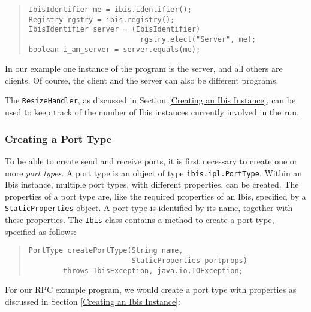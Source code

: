 \documentclass[10pt]{article}
\begin{document}
\begin{quote}
\begin{verbatim}
IbisIdentifier me = ibis.identifier();
Registry rgstry = ibis.registry();
IbisIdentifier server = (IbisIdentifier)
                          rgstry.elect("Server", me);
boolean i_am_server = server.equals(me);
\end{verbatim}
\end{quote}

In our example one instance of the program is the server, and all
others are clients.  Of course, the client and the server can also
be different programs.

The \texttt{ResizeHandler}, as discussed in Section
\ref{Creating an Ibis Instance}, can be used to keep track of the number
of Ibis instances currently involved in the run.

\subsubsection{Creating a Port Type}

To be able to create send and receive ports, it is first necessary
to create one or more \emph{port types}.
A port type is an object
of type \texttt{ibis.ipl.PortType}.
Within an Ibis instance,
multiple port types, with different properties, can be created.
The properties of a port type are, like the required properties
of an Ibis, specified by a \texttt{StaticProperties} object.
A port type is identified by its name, together with these properties.
The \texttt{Ibis} class contains a method to create a port type,
specified as follows:
\begin{quote}
\begin{verbatim}
PortType createPortType(String name,
                        StaticProperties portprops)
        throws IbisException, java.io.IOException;
\end{verbatim}
\end{quote}

\noindent
For our RPC example program, we would create a port type with properties
as discussed in Section \ref{Creating an Ibis Instance}:
\end{document}
